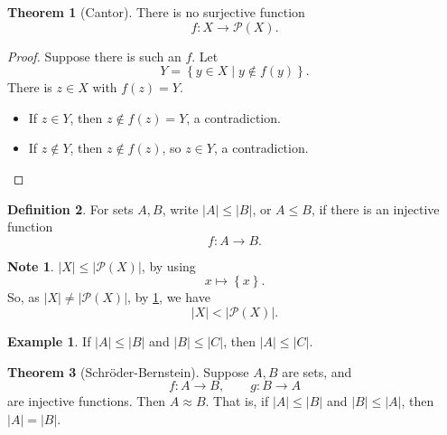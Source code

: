 \documentclass{article}
\newcommand{\rb}[1]{\left( #1 \right)}
\newcommand{\cb}[1]{\left\{ #1 \right\}}
\newcommand{\abs}[1]{\left\lvert #1 \right\rvert}
\theoremstyle{definition}\newtheorem{definition}{Definition}[subsection]
\theoremstyle{definition}\newtheorem{remark1}[definition]{Remark}
\theoremstyle{definition}\newtheorem{example1}[definition]{Example}
\theoremstyle{definition}\newtheorem*{remark2}{Remark}
\theoremstyle{definition}\newtheorem*{example2}{Example}
\theoremstyle{definition}\newtheorem*{note}{Note}
\theoremstyle{definition}\newtheorem*{notation}{Notation}
\newtheorem{theorem}[definition]{Theorem}
\begin{document}
\begin{theorem}[Cantor]
\label{thm:3.1.4}
There is no surjective function
$$ f : X \to \mathcal{P}\rb{X}. $$
\end{theorem}

\begin{proof}
Suppose there is such an $ f $. Let
$$ Y = \cb{y \in X \mid y \notin f\rb{y}}. $$
There is $ z \in X $ with $ f\rb{z} = Y $.
\begin{itemize}
\item If $ z \in Y $, then $ z \notin f\rb{z} = Y $, a contradiction.
\item If $ z \notin Y $, then $ z \notin f\rb{z} $, so $ z \in Y $, a contradiction.
\end{itemize}
\end{proof}


\begin{definition}
For sets $ A, B $, write $ \abs{A} \le \abs{B} $, or $ A \le B $, if there is an injective function
$$ f : A \to B. $$
\end{definition}

\begin{note}
$ \abs{X} \le \abs{\mathcal{P}\rb{X}} $, by using
$$ x \mapsto \cb{x}. $$
So, as $ \abs{X} \ne \abs{\mathcal{P}\rb{X}} $, by \ref{thm:3.1.4}, we have
$$ \abs{X} < \abs{\mathcal{P}\rb{X}}. $$
\end{note}

\begin{example2}
If $ \abs{A} \le \abs{B} $ and $ \abs{B} \le \abs{C} $, then $ \abs{A} \le \abs{C} $.
\end{example2}

\pagebreak

\begin{theorem}[Schr\"oder-Bernstein]
\label{thm:3.1.6}
Suppose $ A, B $ are sets, and
$$ f : A \to B, \qquad g : B \to A $$
are injective functions. Then $ A \approx B $. That is, if $ \abs{A} \le \abs{B} $ and $ \abs{B} \le \abs{A} $, then $ \abs{A} = \abs{B} $.
\end{theorem}
\end{document}
